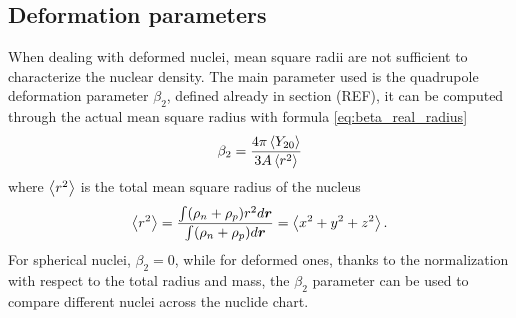 \subsection{Deformation parameters}
When dealing with deformed nuclei, mean square radii are not sufficient to characterize the nuclear density. The main parameter used is the quadrupole deformation parameter $\beta_2$, defined already in section (REF), it can be computed through the actual mean square radius with formula \eqref{eq:beta_real_radius}
\begin{equation}
    \label{eq:beta_real_radius}
    \beta_2 = \frac{4\pi\expval{Y_{2 0}}}{3A\expval{r^2}}
\end{equation}
where $\expval{r^2}$ is the total mean square radius of the nucleus 
\begin{equation}
    \expval{r^2} = \frac{\int (\rho_n + \rho_p )r^2 d\bm r}{\int (\rho_n + \rho_p )d\bm r} = \expval{x^2+y^2+z^2}.
\end{equation}
For spherical nuclei, $\beta_2 = 0$, while for deformed ones, thanks to the normalization with respect to the total radius and mass, the $\beta_2$ parameter can be used to compare different nuclei across the nuclide chart.